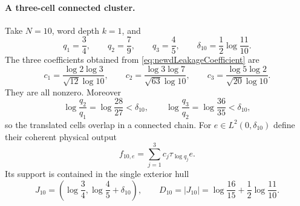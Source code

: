 \documentclass[11pt]{amsart}
\theoremstyle{definition}
\theoremstyle{remark}
\begin{document}
\paragraph{A three-cell connected cluster.}
Take $N=10$, word depth $k=1$, and
\begin{equation}\label{eq:newdThreeCellLabels}
 q_1=\frac34,
 \qquad q_2=\frac79,
 \qquad q_3=\frac45,
 \qquad
 \delta_{10}=\frac12\log\frac{11}{10}.
\end{equation}
The three coefficients obtained from
\eqref{eq:newdLeakageCoefficient} are
\begin{equation}\label{eq:newdThreeCellCoefficients}
 c_1=\frac{\log2\log3}{\sqrt{12}\log10},
 \qquad
 c_2=\frac{\log3\log7}{\sqrt{63}\log10},
 \qquad
 c_3=\frac{\log5\log2}{\sqrt{20}\log10}.
\end{equation}
They are all nonzero.  Moreover
\begin{equation}\label{eq:newdThreeCellConnections}
 \log\frac{q_2}{q_1}=\log\frac{28}{27}<\delta_{10},
 \qquad
 \log\frac{q_3}{q_2}=\log\frac{36}{35}<\delta_{10},
\end{equation}
so the translated cells overlap in a connected chain.  For
$e\in L^2(0,\delta_{10})$ define their coherent physical output
\begin{equation}\label{eq:newdThreeCellOutput}
 f_{10,e}=\sum_{j=1}^3c_j\tau_{\log q_j}e.
\end{equation}
Its support is contained in the single exterior hull
\begin{equation}\label{eq:newdThreeCellHull}
 J_{10}=\left(\log\frac34,
              \log\frac45+\delta_{10}\right),
 \qquad
 D_{10}=|J_{10}|=\log\frac{16}{15}
                 +\frac12\log\frac{11}{10}.
\end{equation}
\end{document}
